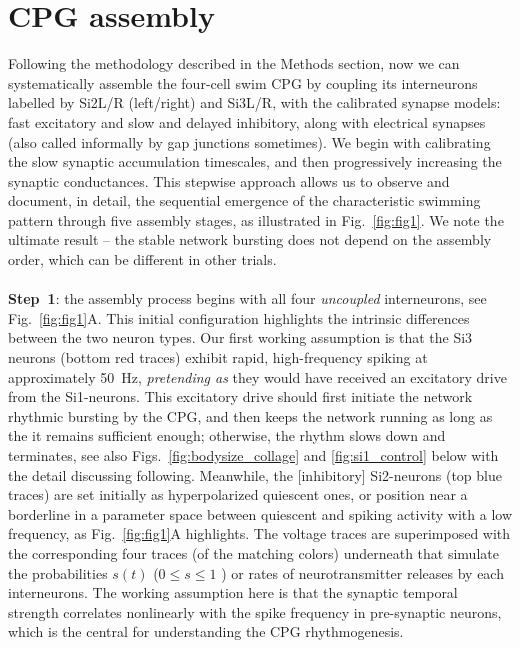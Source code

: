 \documentclass[nofootinbib,aip,amsmath,amssymb,reprint,twocolumn,10pt]{revtex4-2}
\begin{document}
\section{CPG assembly}
%
Following the methodology described in the Methods section, now we can systematically assemble the four-cell swim CPG by coupling its interneurons labelled by Si2L/R (left/right) and Si3L/R, with the calibrated synapse models: fast excitatory and slow and delayed inhibitory, along with electrical synapses (also called informally by gap junctions sometimes).  We begin with calibrating the slow synaptic accumulation timescales, and then progressively increasing the synaptic conductances. This stepwise approach allows us to observe and document, in detail, the sequential emergence of the characteristic swimming pattern through five assembly stages, as illustrated in Fig.~\ref{fig:fig1}. We note the ultimate result -- the stable network bursting does not depend on the assembly order, which can be different in other trials. \\~\\ 
%
{\bf Step~1}: the assembly process begins with all four {\em uncoupled} interneurons, see Fig.~\ref{fig:fig1}A. 
This initial configuration highlights the intrinsic differences between the two neuron types. Our first working assumption is that the Si3 neurons (bottom red traces) exhibit rapid, high-frequency spiking at approximately 50~Hz, {\em pretending as} they would have received an excitatory drive from the Si1-neurons. This excitatory drive should first initiate the network rhythmic bursting by the CPG, and then keeps the network running as long as the it remains sufficient enough; otherwise, the rhythm slows down and terminates, see also Figs.~\ref{fig:bodysize_collage} and \ref{fig:si1_control} below with the detail discussing following. Meanwhile, the [inhibitory] Si2-neurons (top blue traces) are set initially as hyperpolarized quiescent ones, or position near a borderline in a parameter space between quiescent and spiking activity with a low frequency, as Fig.~\ref{fig:fig1}A highlights. The voltage traces are superimposed with the corresponding four traces (of the matching colors) underneath that simulate the probabilities $s(t)$ ($0 \le s \le 1$ ) or rates of neurotransmitter releases by each interneurons. The working assumption here is that the synaptic temporal strength correlates nonlinearly with the spike frequency in  pre-synaptic neurons, which is the central for understanding the CPG rhythmogenesis. \\ ~\\    
\end{document}
